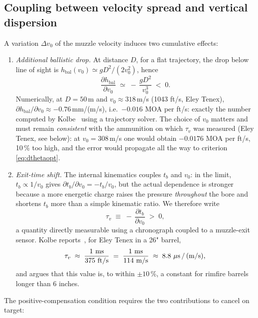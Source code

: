 \documentclass[12pt,a4paper]{article}
\begin{document}
	\subsection{Coupling between velocity spread and vertical dispersion}
	\label{sec:couplage}

	A variation $\Delta v_0$ of the muzzle velocity induces two cumulative effects:
	\begin{enumerate}
		\item \emph{Additional ballistic drop.} At distance $D$, for a flat trajectory, the drop below line of sight is $h_\text{bal}(v_0) \simeq g D^2/(2 v_0^2)$, hence
		\begin{equation}
			\label{eq:dhbal}
			\frac{\partial h_\text{bal}}{\partial v_0} \;\simeq\; -\,\frac{g D^2}{v_0^3} \;<\;0.
		\end{equation}
		Numerically, at $D=50$\,m and $v_0 \approx 318$\,m/s (1043 ft/s, Eley Tenex), $\partial h_\text{bal}/\partial v_0 \approx -0.76$\,mm/(m/s), i.e.\ $-0.016$ MOA per ft/s: exactly the number computed by Kolbe~\cite{Kolbe} using a trajectory solver. The choice of $v_0$ matters and must remain \emph{consistent} with the ammunition on which $\tau_v$ was measured (Eley Tenex, see below): at $v_0 = 308$\,m/s one would obtain $-0.0176$ MOA per ft/s, 10\,\% too high, and the error would propagate all the way to criterion \eqref{eq:dthetaopt}.
		\item \emph{Exit-time shift.} The internal kinematics couples $t_b$ and $v_0$: in the limit, $t_b \propto 1/v_0$ gives $\partial t_b/\partial v_0 = -t_b/v_0$, but the actual dependence is stronger because a more energetic charge raises the pressure \emph{throughout} the bore and shortens $t_b$ more than a simple kinematic ratio. We therefore write
		\begin{equation}
			\tau_v \;\equiv\; -\,\frac{\partial t_b}{\partial v_0} \;>\; 0,
		\end{equation}
		a quantity directly measurable using a chronograph coupled to a muzzle-exit sensor. Kolbe reports~\cite{Kolbe}, for Eley Tenex in a 26" barrel,
		\begin{equation}
			\tau_v \;\approx\; \frac{1\ \text{ms}}{375\ \text{ft/s}} \;=\; \frac{1\ \text{ms}}{114\ \text{m/s}} \;\approx\; 8.8\ \mu\text{s\,/\,(m/s)},
		\end{equation}
		and argues that this value is, to within $\pm 10\,\%$, a constant for rimfire barrels longer than 6 inches.
	\end{enumerate}
	The positive-compensation condition requires the two contributions to cancel on target:
\end{document}
